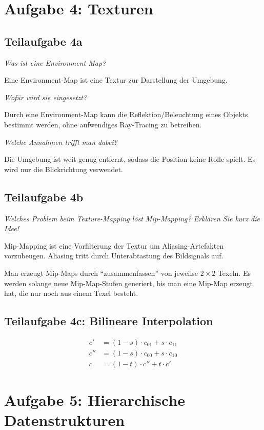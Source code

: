 \documentclass[a4paper]{scrartcl}
\begin{document}
\section*{Aufgabe 4: Texturen}
\subsection*{Teilaufgabe 4a}
\textit{Was ist eine Environment-Map?}

Eine Environment-Map ist eine Textur zur Darstellung der Umgebung.

\textit{Wofür wird sie eingesetzt?}

Durch eine Environment-Map kann die Reflektion/Beleuchtung eines Objekts
bestimmt werden, ohne aufwendiges Ray-Tracing zu betreiben.

\textit{Welche Annahmen trifft man dabei?}

Die Umgebung ist weit genug entfernt, sodass die Position keine Rolle spielt.
Es wird nur die Blickrichtung verwendet.

\subsection*{Teilaufgabe 4b}
\textit{Welches Problem beim Texture-Mapping löst Mip-Mapping? Erklären Sie kurz die Idee!}

Mip-Mapping ist eine Vorfilterung der Textur um Aliasing-Artefakten vorzubeugen.
Aliasing tritt durch Unterabtastung des Bildsignals auf.

Man erzeugt Mip-Maps durch \enquote{zusammenfassen} von jeweilse $2 \times 2$
Texeln. Es werden solange neue Mip-Map-Stufen generiert, bis man eine Mip-Map
erzeugt hat, die nur noch aus einem Texel besteht.

\subsection*{Teilaufgabe 4c: Bilineare Interpolation}

\begin{align}
    c'  &= (1-s) \cdot c_{01} + s \cdot c_{11}\\
    c'' &= (1-s) \cdot c_{00} + s \cdot c_{10}\\
    c   &= (1-t) \cdot c'' + t \cdot c'
\end{align}

\section*{Aufgabe 5: Hierarchische Datenstrukturen}
\end{document}
